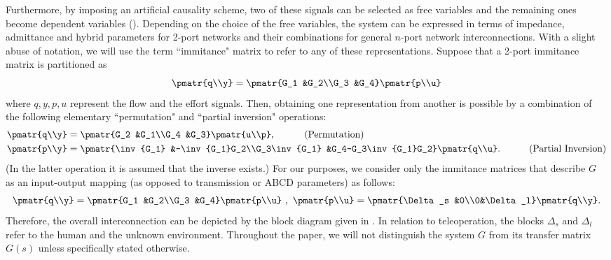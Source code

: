 Furthermore, by imposing an artificial causality scheme, two of these signals can be selected as free variables and the remaining ones become dependent variables (\cite{behavbook}). Depending on the choice of the free variables, the system can be expressed in terms of impedance, admittance and hybrid parameters for 2-port networks and their combinations for general $n$-port network interconnections. With a slight abuse of notation, we will use the term ``immitance" matrix to refer to any of these representations. Suppose that a 2-port immitance matrix is partitioned as
\[
\pmatr{q\\y}=\pmatr{G_1 &G_2\\G_3 &G_4}\pmatr{p\\u}
\]
where $q,y,p,u$ represent the flow and the effort signals. Then, obtaining one representation from another is possible by a combination of the following elementary ``permutation" and ``{partial} inversion" operations:
\begin{align*}
\pmatr{q\\y}&=\pmatr{G_2 &G_1\\G_4 &G_3}\pmatr{u\\p}, \ \ \ \tag{Permutation}\\
\pmatr{p\\y}&=\pmatr{\inv{G_1} &-\inv{G_1}G_2\\G_3\inv{G_1} &G_4-G_3\inv{G_1}G_2}\pmatr{q\\u}. \ \ \ \tag{Partial Inversion}
\end{align*}
(In the latter operation it is assumed that the inverse exists.)
For our purposes, we consider only the immitance matrices that describe $G$ as an input-output mapping (as opposed to transmission or ABCD parameters) as {follows}:
\begin{equation}
\pmatr{q\\y}=\pmatr{G_1 &G_2\\G_3 &G_4}\pmatr{p\\u} \ , \ \pmatr{p\\u}=\pmatr{\Delta_s &0\\0&\Delta_l} \pmatr{q\\y}.
\end{equation}
Therefore, the overall interconnection can be {depicted} by the block diagram given in . In relation to teleoperation, the {blocks} $\Delta_s$ and $\Delta_l$ refer to the human and the unknown environment. Throughout the paper, we will not distinguish the system $G$ from its transfer matrix $G(s)$ unless specifically stated otherwise.


